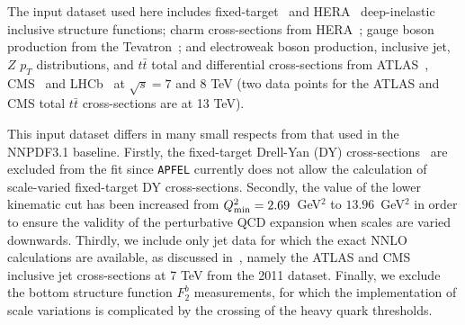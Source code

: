 %
The input dataset used here
includes fixed-target~\cite{Arneodo:1996kd,Arneodo:1996qe,
Whitlow:1991uw,bcdms1,bcdms2,Goncharov:2001qe,MasonPhD,Onengut:2005kv} 
and HERA~\cite{Abramowicz:2015mha} deep-inelastic inclusive structure functions;
charm cross-sections from HERA~\cite{Abramowicz:1900rp};
gauge boson production from the Tevatron~\cite{Aaltonen:2010zza,Abazov:2007jy,
D0:2014kma,Abazov:2013rja}; and electroweak boson production, 
inclusive jet, $Z$ $p_T$ distributions, and $t\bar{t}$ total and differential
cross-sections from ATLAS~\cite{Aad:2011dm,Aaboud:2016btc,Aad:2014qja,
Aad:2013iua,Aad:2015auj,Aad:2011fc,Aad:2014kva,Aaboud:2016pbd,Aad:2015mbv},
CMS~\cite{Chatrchyan:2013tia,Chatrchyan:2012xt,Chatrchyan:2013mza,
Khachatryan:2016pev,Khachatryan:2015oaa,Chatrchyan:2012bja,Khachatryan:2016mqs, 
Khachatryan:2015uqb,Khachatryan:2015oqa} 
and LHCb~\cite{Aaij:2012vn,Aaij:2012mda,Aaij:2015gna,Aaij:2015zlq} 
at $\sqrt{s}=7$ and 8 TeV (two data points for the ATLAS and 
CMS total $t\bar{t}$ cross-sections are at 13 TeV).
\begin{table}[htbp!]
  \centering
  
  \caption{\small The categorization of the input datasets into different processes
    adopted
    in this work.
    Each dataset is assigned to one of five categories:
    neutral-current DIS (DIS NC),
    charged-current DIS (DIS CC), Drell-Yan (DY), jet production (JET) and top quark
    pair production (TOP).
    For each dataset, we also provide the corresponding publication reference
    and the number of data points after cuts.
%
We also show the total number of points in each of the five
categories of process.
    \label{tab:datasets_process_categorisation}}
\end{table}

This input dataset differs in many small respects from that used in the
NNPDF3.1 baseline.
%
Firstly, the fixed-target Drell-Yan (DY)
cross-sections~\cite{Webb:2003ps,Webb:2003bj,Towell:2001nh,Moreno:1990sf} are
excluded from the fit  since {\tt APFEL} currently does
not allow the calculation of scale-varied fixed-target DY cross-sections.
%
Secondly, the value of the lower kinematic
cut has been increased from
$Q_{\rm min}^2=2.69$~GeV$^2$ to
$13.96$~GeV$^2$ in order to ensure the validity of the
perturbative QCD expansion when scales 
are varied downwards.
%
Thirdly, we include only jet data for which the exact NNLO calculations
are available, as discussed in~\cite{Ball:2018iqk}, namely the
ATLAS and CMS inclusive jet cross-sections at 7 TeV
from the 2011 dataset.
%
Finally, we exclude the  bottom structure
function $F_2^b$ measurements, for which the implementation
of scale variations is complicated by the crossing of the heavy quark
thresholds.

